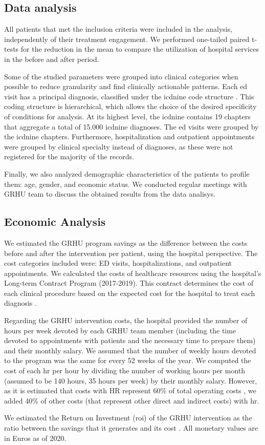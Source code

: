 \documentclass{bmcart}
\begin{document}
\subsection*{Data analysis}
All patients that met the inclusion criteria were included in the analysis, independently of their treatment engagement. 
We performed one-tailed paired t-tests for the reduction in the mean to compare the utilization of hospital services in the before and after period. 
\par Some of the studied parameters were grouped into clinical categories when possible to reduce granularity and find clinically actionable patterns. 
Each \gls{ed} visit has a principal diagnosis, classified under the \gls{icdnine} code structure \cite{noauthor_icd-9-cm_2011}. 
This coding structure is hierarchical, which allows the choice of the desired specificity of conditions for analysis. At its highest level, the \gls{icdnine} contains 19 chapters that aggregate a total of 15.000 \gls{icdnine} diagnoses. 
The \gls{ed} visits were grouped by the \gls{icdnine} chapters.
Furthermore, hospitalization and outpatient appointments were grouped by clinical specialty instead of diagnoses, as these were not registered for the majority of the records.
\par Finally, we also analyzed demographic characteristics of the patients to profile them: age, gender, and economic status. We conducted regular meetings with GRHU team to discuss the obtained results from the data analisys. 

\subsection*{Economic Analysis}
We estimated the GRHU program savings as the difference between the costs before and after the intervention per patient, using the hospital perspective. The cost categories included were: ED visits, hospitalizations, and outpatient appointments. 
We calculated the costs of healthcare resources using the hospital’s Long-term Contract Program (2017-2019). This contract determines the cost of each clinical procedure based on the expected cost for the hospital to treat each diagnosis \cite{noauthor_grupos_nodate}. 
\par Regarding the GRHU intervention costs, the hospital provided the number of hours per week devoted by each GRHU team member (including the time devoted to appointments with patients and the necessary time to prepare them) and their monthly salary.
We assumed that the number of weekly hours devoted to the program was the same for every 52 weeks of the year. We computed the cost of each \gls{hr} per hour by dividing the number of working hours per month (assumed to be 140 hours, 35 hours per week) by their monthly salary. However, as it is estimated that costs with HR represent 60\% of total operating costs \cite{balakrishnan_applying_2015}, we added 40\% of other costs (that represent other direct and indirect costs) with \gls{hr}.
\par We estimated the Return on Investment (\gls{roi}) of the GRHU intervention as the ratio between the savings that it generates and its cost \cite{navratil-strawn_emergency_2014}. All monetary values are in Euros as of 2020.
\end{document}
